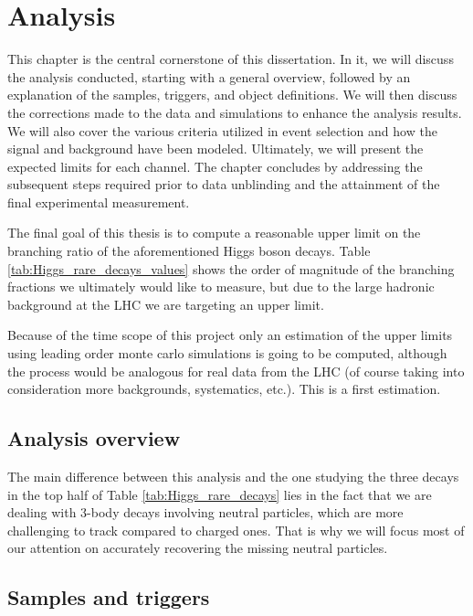 \chapter[Analysis]{Analysis}

This chapter is the central cornerstone of this dissertation. In it, we will discuss the analysis conducted, starting with a general overview, followed by an explanation of the samples, triggers, and object definitions. We will then discuss the corrections made to the data and simulations to enhance the analysis results. We will also cover the various criteria utilized in event selection and how the signal and background have been modeled. Ultimately, we will present the expected limits for each channel. The chapter concludes by addressing the subsequent steps required prior to data unblinding and the attainment of the final experimental measurement.

The final goal of this thesis is to compute a reasonable upper limit on the branching ratio of the aforementioned Higgs boson decays. Table \ref{tab:Higgs_rare_decays_values} shows the order of magnitude of the branching fractions we ultimately would like to measure, but due to the large hadronic background at the LHC we are targeting an upper limit. 

Because of the time scope of this project only an estimation of the upper limits using leading order monte carlo simulations is going to be computed, although the process would be analogous for real data from the LHC (of course taking into consideration more backgrounds, systematics, etc.). This is a first estimation.

\section{Analysis overview}

The main difference between this analysis and the one studying the three decays in the top half of Table \ref{tab:Higgs_rare_decays} lies in the fact that we are dealing with 3-body decays involving neutral particles, which are more challenging to track compared to charged ones. That is why we will focus most of our attention on accurately recovering the missing neutral particles.

\section{Samples and triggers}


